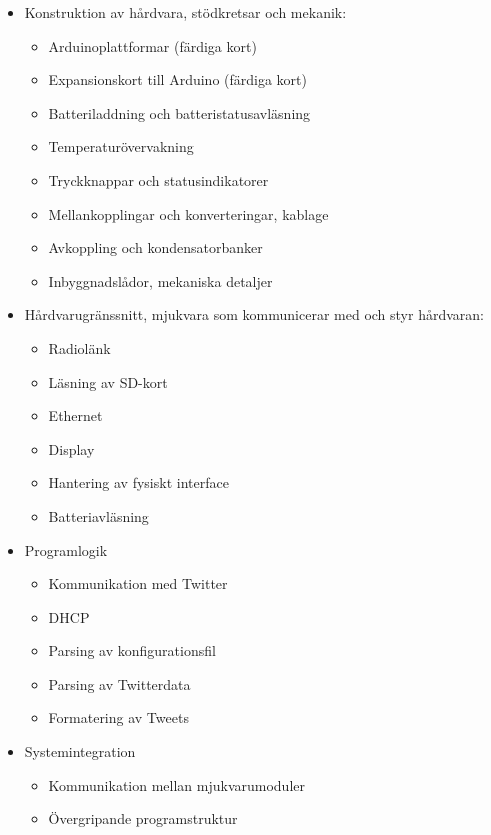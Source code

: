 \documentclass[a4paper,11pt]{article}
\begin{document}
	\begin{itemize}
	\item Konstruktion av hårdvara, stödkretsar och mekanik:
		\begin{itemize}
        	\item Arduinoplattformar (färdiga kort)
        	\item Expansionskort till Arduino (färdiga kort)
        	\item Batteriladdning och batteristatusavläsning
        	\item Temperaturövervakning
        	\item Tryckknappar och statusindikatorer
        	\item Mellankopplingar och konverteringar, kablage
            \item Avkoppling och kondensatorbanker
        	\item Inbyggnadslådor, mekaniska detaljer
        	\end{itemize}	
    	\item Hårdvarugränssnitt, mjukvara som kommunicerar med och styr hårdvaran:
    		\begin{itemize}
        	\item Radiolänk
        	\item Läsning av SD-kort
        	\item Ethernet
        	\item Display
            \item Hantering av fysiskt interface
            \item Batteriavläsning
        	\end{itemize}
    	\item Programlogik
    		\begin{itemize}
        	\item Kommunikation med Twitter
        	\item DHCP
        	\item Parsing av konfigurationsfil
        	\item Parsing av Twitterdata
        	\item Formatering av Tweets
        	\end{itemize}
    	\item Systemintegration
    		\begin{itemize}
        	\item Kommunikation mellan mjukvarumoduler
        	\item Övergripande programstruktur
        	\end{itemize}
	\end{itemize}	
\end{document}
